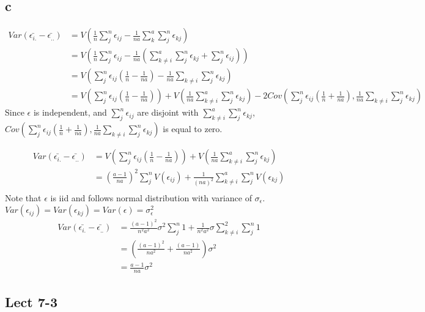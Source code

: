 \documentclass[11pt,letterpaper]{article}
\begin{document}
\subsection*{c}
\begin{align*}
Var(\bar{\epsilon_{i.}}  - \bar{\epsilon_{..}}) &= V(\frac{1}{n} \sum_j^n \epsilon_{ij} - \frac{1}{na} \sum_k^a \sum_j^n \epsilon_{kj}) \\
&= V(\frac{1}{n} \sum_j^n \epsilon_{ij} - \frac{1}{na} (\sum_{k \neq i}^a \sum_j^n \epsilon_{kj} + \sum_j^n \epsilon_{ij})) \\
&= V(\sum_j^n \epsilon_{ij} (\frac{1}{n} - \frac{1}{na}) - \frac{1}{na} \sum_{k \neq i} \sum_j^n \epsilon_{kj}  ) \\
&= V(\sum_j^n \epsilon_{ij} (\frac{1}{n} - \frac{1}{na})) + V(\frac{1}{na} \sum_{k \neq i}^a \sum_j^n \epsilon_{kj} ) - 2 Cov(\sum_j^n \epsilon_{ij} (\frac{1}{n} + \frac{1}{na}), \frac{1}{na} \sum_{k \neq i} \sum_j^n \epsilon_{kj})
\end{align*}
\noindent Since $\epsilon$ is independent, and $\sum_j^n \epsilon_{ij}$ are disjoint with $\sum_{k \neq i}^a \sum_j^n \epsilon_{kj}$, $Cov(\sum_j^n \epsilon_{ij} (\frac{1}{n} + \frac{1}{na}), \frac{1}{na} \sum_{k \neq i} \sum_j^n \epsilon_{kj})$ is equal to zero.

\begin{align*}
Var(\bar{\epsilon_{i.}}  - \bar{\epsilon_{..}}) &= V(\sum_j^n \epsilon_{ij} (\frac{1}{n} - \frac{1}{na})) + V(\frac{1}{na} \sum_{k \neq i}^a \sum_j^n \epsilon_{kj} ) \\
&= (\frac{a-1}{na})^2 \sum_j^n V(\epsilon_{ij}) + \frac{1}{(na)^2} \sum_{k \neq i}^a \sum_j^n V( \epsilon_{kj} ) \\
\end{align*}
\noindent Note that $\epsilon$ is iid and follows normal distribution with variance of $\sigma_{\epsilon}$. $Var(\epsilon_{ij}) = Var(\epsilon_{kj}) = Var(\epsilon) = \sigma^2_{\epsilon}$
\begin{align*}
Var(\bar{\epsilon_{i.}}  - \bar{\epsilon_{..}}) &= \frac{(a-1)^2}{n^2 a^2} \sigma^2 \sum_j^n 1 + \frac{1}{n^2 a^2} \sigma \sum_{k \neq i}^2 \sum_j^n 1 \\
&= ( \frac{(a-1)^2}{na^2} + \frac{(a-1)}{na^2} ) \sigma^2 \\
&= \frac{a-1}{na} \sigma^2
 \end{align*}

\subsection*{Lect 7-3}
\end{document}
